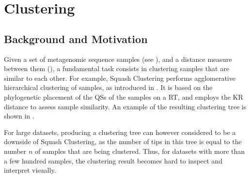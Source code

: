 
\chapter{Clustering}
\label{ch:Clustering}




\section{Background and Motivation}
\label{ch:Clustering:sec:Motivation}

Given a set of metagenomic sequence samples (see ),
and a distance measure between them (),
a fundamental task consists in clustering samples that are similar to each other.
For example, Squash Clustering performs agglomerative hierarchical clustering of samples,
as introduced in .
It is based on the phylogenetic placement of the \acfp{QS} of the samples on a \acf{RT},
and employs the KR distance to assess sample similarity.
An example of the resulting clustering tree is shown in .

For large datasets, producing a clustering tree can however considered to be a downside of Squash Clustering,
as the number of tips in this tree is equal to the number $n$ of samples that are being clustered.
Thus, for datasets with more than a few hundred samples,
the clustering result becomes hard to inspect and interpret visually.

